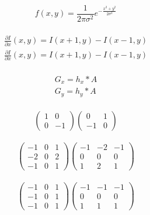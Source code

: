 \documentclass{article}
\begin{document}
\huge
\begin{equation}
f(x, y) = \frac{1}{2\pi\sigma^2}e^{-\frac{x^2+y^2}{2\sigma^2}}
\end{equation}
\\

\begin{equation}

\begin{aligned}
\frac{\partial I}{\partial x}(x, y) = I(x + 1, y) - I(x - 1, y)\\
\frac{\partial I}{\partial x}(x, y) = I(x + 1, y) - I(x - 1, y)
\end{aligned}
\end{equation}
\\

\begin{equation}
\label{eq:3}
\begin{aligned}
G_x = h_x * A \\
G_y = h_y * A 
\end{aligned}
\end{equation}
\\

\begin{equation}
\begin{pmatrix}
1 & 0 \\
0 & -1 
\end{pmatrix}
\begin{pmatrix}
0 & 1 \\
-1 & 0
\end{pmatrix}
\end{equation}
\\

\begin{equation}
\begin{pmatrix}
-1 & 0 & 1 \\
-2 & 0 & 2 \\
-1 & 0 & 1
\end{pmatrix}
\begin{pmatrix}
-1 & -2 & -1 \\
0 & 0 & 0 \\
1 & 2 & 1
\end{pmatrix}
\end{equation}
\\

\begin{equation}
\begin{pmatrix}
-1 & 0 & 1 \\
-1 & 0 & 1 \\
-1 & 0 & 1
\end{pmatrix}
\begin{pmatrix}
-1 & -1 & -1 \\
0 & 0 & 0 \\
1 & 1 & 1
\end{pmatrix}
\end{equation}
\\
\end{document}

